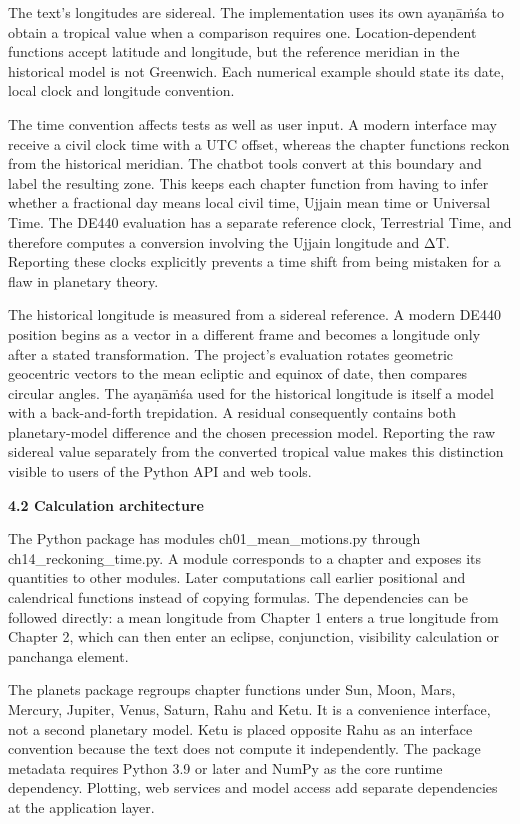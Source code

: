 \documentclass[
]{article}
\begin{document}
The text's longitudes are sidereal. The implementation uses its own
ayaṇāṁśa to obtain a tropical value when a comparison requires one.
Location-dependent functions accept latitude and longitude, but the
reference meridian in the historical model is not Greenwich. Each
numerical example should state its date, local clock and longitude
convention.

The time convention affects tests as well as user input. A modern
interface may receive a civil clock time with a UTC offset, whereas the
chapter functions reckon from the historical meridian. The chatbot tools
convert at this boundary and label the resulting zone. This keeps each
chapter function from having to infer whether a fractional day means
local civil time, Ujjain mean time or Universal Time. The DE440
evaluation has a separate reference clock, Terrestrial Time, and
therefore computes a conversion involving the Ujjain longitude and ΔT.
Reporting these clocks explicitly prevents a time shift from being
mistaken for a flaw in planetary theory.

The historical longitude is measured from a sidereal reference. A modern
DE440 position begins as a vector in a different frame and becomes a
longitude only after a stated transformation. The project's evaluation
rotates geometric geocentric vectors to the mean ecliptic and equinox of
date, then compares circular angles. The ayaṇāṁśa used for the
historical longitude is itself a model with a back-and-forth
trepidation. A residual consequently contains both planetary-model
difference and the chosen precession model. Reporting the raw sidereal
value separately from the converted tropical value makes this
distinction visible to users of the Python API and web tools.

\textbf{4.2 Calculation architecture}

The Python package has modules ch01\_mean\_motions.py through
ch14\_reckoning\_time.py. A module corresponds to a chapter and exposes
its quantities to other modules. Later computations call earlier
positional and calendrical functions instead of copying formulas. The
dependencies can be followed directly: a mean longitude from Chapter 1
enters a true longitude from Chapter 2, which can then enter an eclipse,
conjunction, visibility calculation or panchanga element.

The planets package regroups chapter functions under Sun, Moon, Mars,
Mercury, Jupiter, Venus, Saturn, Rahu and Ketu. It is a convenience
interface, not a second planetary model. Ketu is placed opposite Rahu as
an interface convention because the text does not compute it
independently. The package metadata requires Python 3.9 or later and
NumPy as the core runtime dependency. Plotting, web services and model
access add separate dependencies at the application layer.
\end{document}
